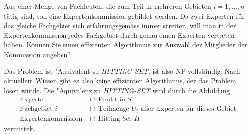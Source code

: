 Aus einer Menge von Fachleuten, die zum Teil in mehreren Gebieten
$i=1,\dots,n$ tätig sind, soll eine Expertenkommission gebildet werden.
Da zwei Experten für das gleiche Fachgebiet sich erfahrungsgemäss
immer streiten, will man in der Expertenkommission jedes Fachgebiet
durch genau einen Experten vertreten haben. Können Sie einen effizienten
Algorithmus zur Auswahl der Mitglieder der Kommission angeben?

\begin{loesung}
Das Problem ist "Aquivalent zu \textsl{HITTING-SET}, ist also
NP-vollständig. Nach aktuellem Wissen gibt es also keine
effizienten Algorithmus, der das Problem lösen würde. Die
"Aquivalenz zu \textsl{HITTING-SET} wird durch die Abbildung
\begin{align*}
\text{Experte}&\mapsto \text{Punkt in $S$}\\
\text{Fachgebiet $i$}&\mapsto \text{Teilmenge $U_i$ aller Experten für dieses Gebiet}\\
\text{Expertenkommission}&\mapsto \text{Hitting Set $H$}
\end{align*}
vermittelt.
\end{loesung}
